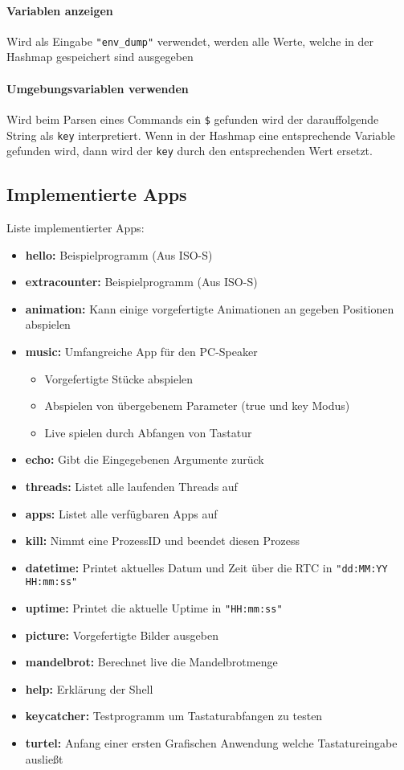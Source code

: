         \paragraph{Variablen anzeigen}
            Wird als Eingabe \verb|"env_dump"| verwendet, werden alle Werte, welche in der Hashmap gespeichert sind ausgegeben
        \paragraph{Umgebungsvariablen verwenden}
            Wird beim Parsen eines Commands ein \verb|$| gefunden wird der darauffolgende String als \verb|key| interpretiert. Wenn in der Hashmap eine entsprechende Variable gefunden wird, dann wird der \verb|key| durch den entsprechenden Wert ersetzt.

\subsection{Implementierte Apps}
    Liste implementierter Apps:
    \begin{itemize}
        \item \textbf{hello:} Beispielprogramm (Aus ISO-S)
        \item \textbf{extracounter:} Beispielprogramm (Aus ISO-S)
        \item \textbf{animation:} Kann einige vorgefertigte Animationen an gegeben Positionen abspielen
        \item \textbf{music:} Umfangreiche App für den PC-Speaker\begin{itemize}
            \item Vorgefertigte Stücke abspielen
            \item Abspielen von übergebenem Parameter (true und key Modus)
            \item Live spielen durch Abfangen von Tastatur
        \end{itemize}
        \item \textbf{echo:} Gibt die Eingegebenen Argumente zurück
        \item \textbf{threads:} Listet alle laufenden Threads auf
        \item \textbf{apps:} Listet alle verfügbaren Apps auf
        \item \textbf{kill:} Nimmt eine ProzessID und beendet diesen Prozess
        \item \textbf{datetime:} Printet aktuelles Datum und Zeit über die RTC in \verb|"dd:MM:YY   HH:mm:ss"|
        \item \textbf{uptime:} Printet die aktuelle Uptime in \verb|"HH:mm:ss"|
        \item \textbf{picture:} Vorgefertigte Bilder ausgeben
        \item \textbf{mandelbrot:} Berechnet live die Mandelbrotmenge
        \item \textbf{help:} Erklärung der Shell
        \item \textbf{keycatcher:} Testprogramm um Tastaturabfangen zu testen
        \item \textbf{turtel:} Anfang einer ersten Grafischen Anwendung welche Tastatureingabe ausließt
    \end{itemize}

